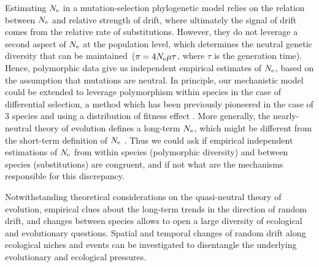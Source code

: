 Estimating $N_{\mathrm{e}}$ in a mutation-selection phylogenetic model relies on the relation between $N_{\mathrm{e}}$ and relative strength of drift, where ultimately the signal of drift comes from the relative rate of substitutions.
However, they do not leverage a second aspect of $N_{\mathrm{e}}$ at the population level, which determines the neutral genetic diversity that can be maintained~($\pi=4N_{\mathrm{e}} \mu \tau$, where $\tau$ is the generation time).
Hence, polymorphic data give us independent empirical estimates of $N_{\mathrm{e}}$, based on the assumption that mutations are neutral.
In principle, our mechanistic model could be extended to leverage polymorphism within species in the case of differential selection, a method which has been previously pioneered in the case of $3$ species and using a distribution of fitness effect \citep{Wilson2011}.
More generally, the nearly-neutral theory of evolution defines a long-term $N_{\mathrm{e}}$, which might be different from the short-term definition of $N_{\mathrm{e}}$ \citep{Platt2018}.
Thus we could ask if empirical independent estimations of $N_{\mathrm{e}}$ from within species (polymorphic diversity) and between species (substitutions) are congruent, and if not what are the mechanisms responsible for this discrepancy.

Notwithstanding theoretical considerations on the quasi-neutral theory of evolution, empirical clues about the long-term trends in the direction of random drift, and changes between species allows to open a large diversity of ecological and evolutionary questions.
Spatial and temporal changes of random drift along ecological niches and events can be investigated to disentangle the underlying evolutionary and ecological pressures.

